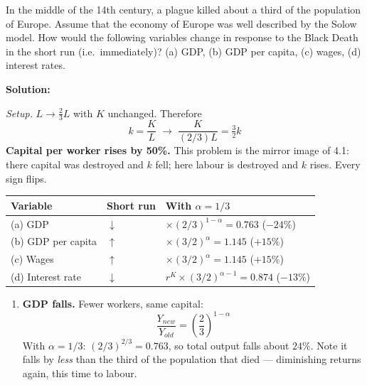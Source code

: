 \documentclass[12pt, letterpaper]{article}
\begin{document}
\begin{tcolorbox}[evenbox,title={Problem 4.2 \quad The Black Death}]
\begin{tcolorbox}[questionbox]
In the middle of the 14th century, a plague killed about a third of the population of Europe.
Assume that the economy of Europe was well described by the Solow model. How would the
following variables change in response to the Black Death in the short run (i.e.\
immediately)? (a) GDP, (b) GDP per capita, (c) wages, (d) interest rates.
\end{tcolorbox}

\textbf{Solution:}

\emph{Setup.} $L \to \tfrac{2}{3}L$ with $K$ unchanged. Therefore
$$k = \frac{K}{L} \;\longrightarrow\; \frac{K}{(2/3)L} = \tfrac{3}{2}k$$
\textbf{Capital per worker rises by 50\%.} This problem is the mirror image of 4.1: there
capital was destroyed and $k$ fell; here labour is destroyed and $k$ rises. Every sign flips.

\begin{center}
\begin{tabular}{lll}
\toprule
\textbf{Variable} & \textbf{Short run} & \textbf{With $\alpha = 1/3$} \\
\midrule
(a) GDP            & $\downarrow$ & $\times (2/3)^{1-\alpha} = 0.763$ \quad ($-24\%$) \\
(b) GDP per capita & $\uparrow$   & $\times (3/2)^{\alpha} = 1.145$ \quad ($+15\%$) \\
(c) Wages          & $\uparrow$   & $\times (3/2)^{\alpha} = 1.145$ \quad ($+15\%$) \\
(d) Interest rate  & $\downarrow$ & $r^K \times (3/2)^{\alpha-1} = 0.874$ \quad ($-13\%$) \\
\bottomrule
\end{tabular}
\end{center}

\begin{enumerate}

\item \textbf{GDP falls.} Fewer workers, same capital:
$$\frac{Y_{new}}{Y_{old}} = \left(\frac{2}{3}\right)^{1-\alpha}$$
With $\alpha = 1/3$: $(2/3)^{2/3} = 0.763$, so total output falls about $24\%$. Note it falls
by \emph{less} than the third of the population that died --- diminishing returns again, this
time to labour.


\end{enumerate}
\end{tcolorbox}
\end{document}

